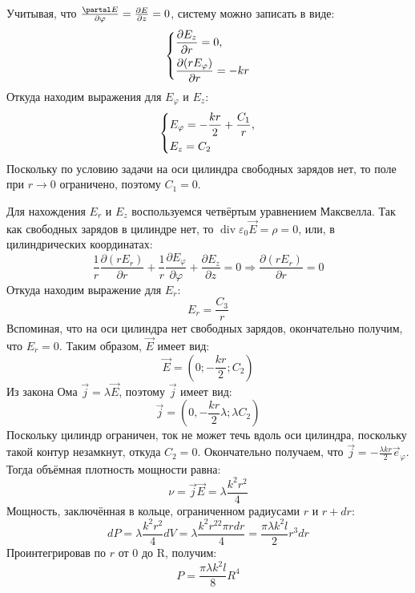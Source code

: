 \documentclass[11pt]{article}
\begin{document}
Учитывая, что \(\frac{\partal E}{\partial\varphi} = \frac{\partial E}{\partial z} = 0\), систему можно записать в
виде:
\begin{equation*}
\begin{dcases}
\frac{\partial E_z}{\partial r} = 0, \\
\frac{\partial (rE_\varphi)}{\partial r} = -kr
\end{dcases}
\end{equation*}
Откуда находим выражения для \(E_\varphi\) и \(E_z\):
\begin{equation}
\begin{dcases}
E_\varphi = -\frac{kr}2 + \frac{C_1}r, \\
E_z = C_2
\end{dcases}
\end{equation}
Поскольку по условию задачи на оси цилиндра свободных зарядов нет, то поле при \(r \to 0\) ограничено, поэтому
\(C_1 = 0\).

Для нахождения \(E_r\) и \(E_z\) воспользуемся четвёртым уравнением Максвелла. Так как свободных зарядов в цилиндре
нет, то \(\operatorname{div}\varepsilon_0\vec E = \rho = 0\), или, в цилиндрических координатах:
\begin{equation*}
\frac{1}r\frac{\partial(rE_r)}{\partial r} + \frac{1}r\frac{\partial E_\varphi}{\partial \varphi}
+ \frac{\partial E_z}{\partial z} = 0 \Rightarrow \frac{\partial (rE_r)}{\partial r} = 0
\end{equation*}
Откуда находим выражение для \(E_r\):
\begin{equation}
E_r = \frac{C_3}r
\end{equation}
Вспоминая, что на оси цилиндра нет свободных зарядов, окончательно получим, что \(E_r = 0\). Таким образом, \(\vec E\)
имеет вид:
\begin{equation}
\vec E = (0; -\frac{kr}2; C_2)
\end{equation}
Из закона Ома \(\vec j = \lambda\vec E\), поэтому \(\vec j\) имеет вид:
\begin{equation}
\vec j = (0, -\frac{kr}2\lambda; \lambda C_2)
\end{equation}
Поскольку цилиндр ограничен, ток не может течь вдоль оси цилиндра, поскольку такой контур незамкнут, откуда \(C_2 = 0\).
Окончательно получаем, что \(\vec j = -\frac{\lambda kr}2\vec e_\varphi\). Тогда объёмная плотность мощности равна:
$$\nu = \vec j \vec E = \lambda\frac{k^2r^2}4$$
Мощность, заключённая в кольце, ограниченном радиусами \(r\) и \(r + dr\):
$$dP = \lambda\frac{k^2r^2}4dV = \lambda\frac{k^2r^22\pi rdr}4 = \frac{\pi\lambda k^2l}2r^3dr$$
Проинтегрировав по \(r\) от 0 до R, получим:
$$P = \frac{\pi\lambda k^2l}8R^4$$
\end{document}
